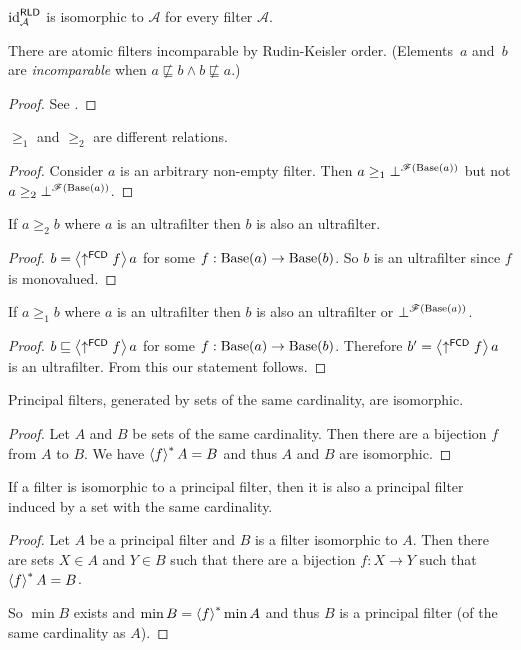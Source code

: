 \begin{cor}
${\operatorname{id}}_{\mathcal{A}}^{\mathsf{RLD}}$ is isomorphic to $\mathcal{A}$
for every filter $\mathcal{A}$.\end{cor}
\begin{thm}
There are atomic filters incomparable by Rudin-Keisler order. (Elements~$a$
and~$b$ are \emph{incomparable} when $a\nsqsubseteq b\land b\nsqsubseteq a$.)\end{thm}
\begin{proof}
See \cite{Gryzlov1997151}.\end{proof}
\begin{thm}
$\ge_{1}$ and $\ge_{2}$ are different relations.\end{thm}
\begin{proof}
Consider $a$ is an arbitrary non-empty filter. Then $a\ge_{1}\bot^{\mathscr{F}(\operatorname{Base}(a))}$
but not $a\ge_{2}\bot^{\mathscr{F}(\operatorname{Base}(a))}$.\end{proof}
\begin{prop}
If $a\ge_{2}b$ where $a$ is an ultrafilter then $b$ is also an
ultrafilter.\end{prop}
\begin{proof}
$b=\left\langle \uparrow^{\mathsf{FCD}}f\right\rangle a$ for some $f:\operatorname{Base}(a)\rightarrow\operatorname{Base}(b)$.
So $b$ is an ultrafilter since $f$ is monovalued.\end{proof}
\begin{cor}
If $a\ge_{1}b$ where $a$ is an ultrafilter then $b$ is also an
ultrafilter or $\bot^{\mathscr{F}(\operatorname{Base}(a))}$.\end{cor}
\begin{proof}
$b\sqsubseteq\left\langle \uparrow^{\mathsf{FCD}}f\right\rangle a$ for some $f:\operatorname{Base}(a)\rightarrow\operatorname{Base}(b)$.
Therefore $b'=\left\langle \uparrow^{\mathsf{FCD}}f\right\rangle a$ is an ultrafilter.
From this our statement follows.\end{proof}
\begin{prop}
Principal filters, generated by sets of the same cardinality, are
isomorphic.\end{prop}
\begin{proof}
Let $A$ and $B$ be sets of the same cardinality. Then there are
a bijection $f$ from $A$ to $B$. We have $\left\langle f\right\rangle ^{\ast}A=B$ and thus
$A$ and $B$ are isomorphic.\end{proof}
\begin{prop}
If a filter is isomorphic to a principal filter, then it is also a
principal filter induced by a set with the same cardinality.\end{prop}
\begin{proof}
Let $A$ be a principal filter and $B$ is a filter isomorphic to
$A$. Then there are sets $X\in A$ and $Y\in B$ such that there
are a bijection $f:X\rightarrow Y$ such that $\left\langle f\right\rangle ^{\ast}A=B$.

So $\min B$ exists and $\min B=\left\langle f\right\rangle ^{\ast}\min A$ and thus $B$ is
a principal filter (of the same cardinality as $A$).\end{proof}
